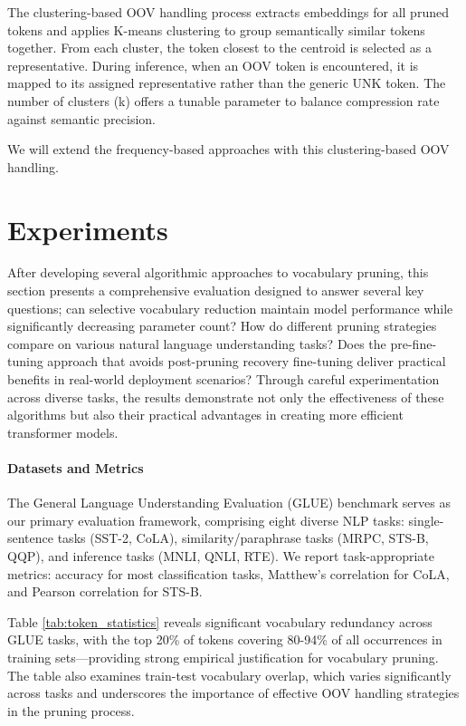 \documentclass[twocolumn]{article}
\begin{document}
The clustering-based OOV handling process extracts embeddings for all pruned tokens and applies K-means clustering to group semantically similar tokens together. From each cluster, the token closest to the centroid is selected as a representative. During inference, when an OOV token is encountered, it is mapped to its assigned representative rather than the generic UNK token. 
The number of clusters (k) offers a tunable parameter to balance compression rate against semantic precision.

We will extend the frequency-based approaches with this clustering-based OOV handling.


\section{Experiments}
After developing several algorithmic approaches to vocabulary pruning, this section presents a comprehensive evaluation designed to answer several key questions; can selective vocabulary reduction maintain model performance while significantly decreasing parameter count? How do different pruning strategies compare on various natural language understanding tasks? Does the pre-fine-tuning approach that avoids post-pruning recovery fine-tuning deliver practical benefits in real-world deployment scenarios? Through careful experimentation across diverse tasks, the results demonstrate not only the effectiveness of these algorithms but also their practical advantages in creating more efficient transformer models.


\paragraph{Datasets and Metrics} 
The General Language Understanding Evaluation (GLUE) benchmark\cite{wang2018glue} serves as our primary evaluation framework, comprising eight diverse NLP tasks: single-sentence tasks (SST-2, CoLA), similarity/paraphrase tasks (MRPC, STS-B, QQP), and inference tasks (MNLI, QNLI, RTE). We report task-appropriate metrics: accuracy for most classification tasks, Matthew's correlation for CoLA, and Pearson correlation for STS-B. 

Table \ref{tab:token_statistics} reveals significant vocabulary redundancy across GLUE tasks, with the top 20\% of tokens covering 80-94\% of all occurrences in training sets—providing strong empirical justification for vocabulary pruning. 
The table also examines train-test vocabulary overlap, which varies significantly across tasks and underscores the importance of effective OOV handling strategies in the pruning process.
\end{document}

